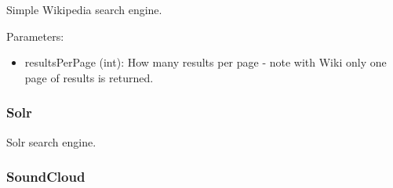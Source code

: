 \documentclass[letterpaper,10pt,english]{sphinxmanual}
\begin{document}
\begin{fulllineitems}
\label{api3.0:puppy.search.engine.SimpleWikipedia}
Simple Wikipedia search engine.

Parameters:
\begin{itemize}
\item {} 
resultsPerPage (int): How many results per page - note with Wiki only one page of results is returned.

\end{itemize}

\end{fulllineitems}



\subsubsection{Solr}
\label{api3.0:solr}

\begin{fulllineitems}
\label{api3.0:puppy.search.engine.Solr}
Solr search engine.

\end{fulllineitems}



\subsubsection{SoundCloud}
\label{api3.0:soundcloud}
\end{document}
